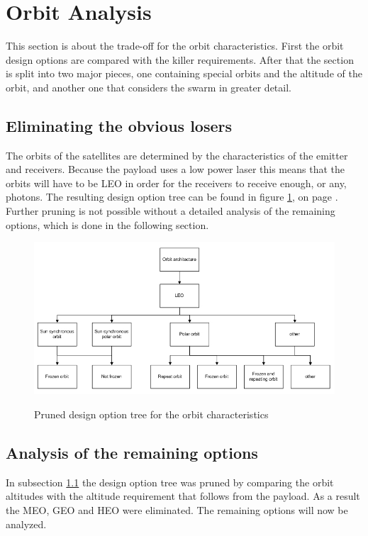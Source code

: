 \section{Orbit Analysis}
This section is about the trade-off for the orbit characteristics. First the orbit design options are compared with the killer requirements. After that the section is split into two major pieces, one containing special orbits and the altitude of the orbit, and another one that considers the swarm in greater detail.
\label{AnalOrb}

\subsection{Eliminating the obvious losers}
\label{pruneOrbit}
The orbits of the satellites are determined by the characteristics of the emitter and receivers. Because the payload uses a low power laser this means that the orbits will have to be \ac{LEO} in order for the receivers to receive enough, or any, photons. The resulting design option tree can be found in figure \ref{fig:pruneOrbit}, on page \pageref{fig:pruneOrbit}. Further pruning is not possible without a detailed analysis of the remaining options, which is done in the following section.

\begin{figure}[b]
\centering
\includegraphics[width=1.0\textwidth, angle=0]{chapters/img/PrunedOrbit.jpg}
\label{fig:pruneOrbit}
\caption{Pruned design option tree for the orbit characteristics}
\end{figure}

\subsection{Analysis of the remaining options}
\label{AnalSpOrb}

In subsection \ref{pruneOrbit} the design option tree was pruned by comparing the orbit altitudes with the altitude requirement that follows from the payload. As a result the \acs{MEO}, \acs{GEO} and \acs{HEO} were eliminated. The remaining options will now be analyzed.

